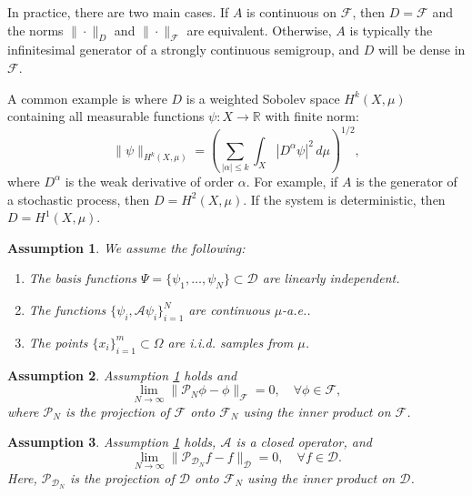 \documentclass{article}[11]
\newtheorem{assumption}{Assumption}
\begin{document}
In practice, there are two main cases. If \( A \) is continuous on \( \mathcal{F} \), then \( D = \mathcal{F} \) and the norms \( \| \cdot \|_D \) and \( \| \cdot \|_{\mathcal{F}} \) are equivalent. Otherwise, \( A \) is typically the infinitesimal generator of a strongly continuous semigroup, and \( D \) will be dense in \( \mathcal{F} \). 

A common example is where \( D \) is a weighted Sobolev space \( H^k(X, \mu) \) containing all measurable functions \( \psi : X \to \mathbb{R} \) with finite norm:
\[
\| \psi \|_{H^k(X, \mu)} = \left( \sum_{|\alpha| \leq k} \int_X |D^\alpha \psi|^2 \, d\mu \right)^{1/2},
\]
where \( D^\alpha \) is the weak derivative of order \( \alpha \). For example, if \( A \) is the generator of a stochastic process, then \( D = H^2(X, \mu) \). If the system is deterministic, then \( D = H^1(X, \mu) \).



\begin{assumption}\label{assumption_1}
	We assume the following:
	\begin{enumerate}
		\item The basis functions $\Psi = \{ \psi_1, \dots, \psi_N \} \subset \mathcal{D}$ are linearly independent.
		\item The functions $\{ \psi_i, \mathcal{A} \psi_i \}_{i=1}^N$ are continuous $\mu$-a.e..
		\item The points $\{ x_i \}_{i=1}^m \subset \Omega$ are i.i.d. samples from $\mu$.
	\end{enumerate}
\end{assumption}

\begin{assumption}\label{assumption_2}
	Assumption \ref{assumption_1} holds and
	\[
	\lim_{N \to \infty} \| \mathcal{P}_N \phi - \phi \|_{\mathcal{F}} = 0, \quad \forall \phi \in \mathcal{F},
	\]
	where $\mathcal{P}_N$ is the projection of $\mathcal{F}$ onto $\mathcal{F}_N$ using the inner product on $\mathcal{F}$.	
\end{assumption}

\begin{assumption}\label{assumption_3}
	Assumption \ref{assumption_1} holds, $\mathcal{A}$ is a closed operator, and
	\[
	\lim_{N \to \infty} \| \mathcal{P}_{\mathcal{D}_N} f - f \|_{\mathcal{D}} = 0, \quad \forall f \in \mathcal{D}.
	\]
	Here, $\mathcal{P}_{\mathcal{D}_N}$ is the projection of $\mathcal{D}$ onto $\mathcal{F}_N$ using the inner product on $\mathcal{D}$.
\end{assumption}
\end{document}
